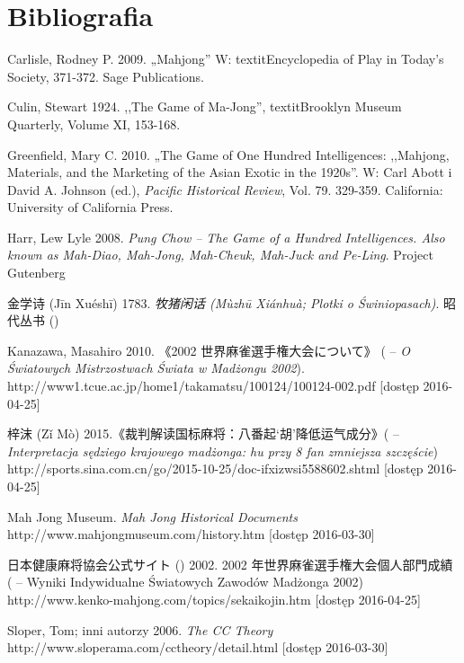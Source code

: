 \onecolumn
\section*{Bibliografia}
Carlisle, Rodney P. 2009. „Mahjong” W: textit{Encyclopedia of Play in Today's
Society}, 371-372.
Sage Publications.

Culin, Stewart 1924. ,,The Game of Ma-Jong'', textit{Brooklyn Museum Quarterly},
Volume XI, 153-168.


Greenfield, Mary C. 2010. „The Game of One Hundred Intelligences: ,,Mahjong,
Materials, and the Marketing of the Asian Exotic in the 1920s''. W: Carl Abott i
David A. Johnson (ed.), \textit{Pacific Historical Review}, Vol. 79. 329-359.
California: University of California Press.

Harr, Lew Lyle 2008. \textit{Pung Chow -- The Game of a Hundred Intelligences.
Also known as Mah-Diao, Mah-Jong, Mah-Cheuk, Mah-Juck and Pe-Ling}. Project
Gutenberg

金学诗 (Jīn Xuéshī) 1783. \textit{牧猪闲话 (Mùzhū Xiánhuà; Plotki o Świniopasach)}.
昭代丛书 ()

Kanazawa, Masahiro 2010. 《2002 世界麻雀選手権大会について》 ( -- \textit{O Światowych Mistrzostwach Świata w Madżongu
2002}).
\\http://www1.tcue.ac.jp/home1/takamatsu/100124/100124-002.pdf [dostęp
2016-04-25]

梓沫 (Zǐ Mò) 2015.《裁判解读国标麻将：八番起‘胡’降低运气成分》( -- \textit{Interpretacja sędziego krajowego madżonga:
hu przy 8 fan zmniejsza szczęście}) %
\\http://sports.sina.com.cn/go/2015-10-25/doc-ifxizwsi5588602.shtml [dostęp 2016-04-25]

Mah Jong Museum. \textit{Mah Jong Historical Documents}
\\http://www.mahjongmuseum.com/history.htm [dostęp
2016-03-30]


日本健康麻将協会公式サイト () 2002.
2002 年世界麻雀選手権大会個人部門成績 ( -- Wyniki Indywidualne Światowych Zawodów Madżonga
2002) \\http://www.kenko-mahjong.com/topics/sekaikojin.htm [dostęp 2016-04-25]

Sloper, Tom; inni autorzy 2006. \textit{The CC Theory}
\\http://www.sloperama.com/cctheory/detail.html [dostęp
2016-03-30]

